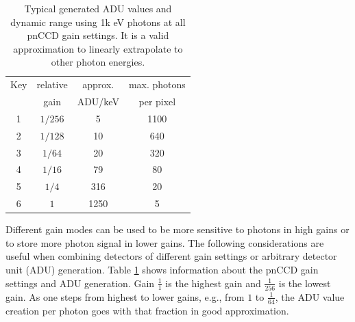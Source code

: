\begin{table}%
\centering
\begin{tabular}{ |c c c c |}
 \hline
 Key & relative  & approx.  & max. photons \\ 
     &   gain    & ADU/keV  & per pixel  \\
 \hline
 1 & $1/256$ & 5 & 1100  \\
 2 & $1/128$ & 10 & 640   \\
 3 & $1/64$ & 20 & 320   \\
 4 & $1/16$ & 79 & 80  \\
 5 & $1/4$ & 316 & 20  \\
 6 & $1$ & 1250 & 5  \\
 \hline
\end{tabular}
\caption[pnCCD gain modes and typical ADU values at 1k eV photons.]{Typical generated ADU values and dynamic range using 1k eV photons at all pnCCD gain settings. It is a valid approximation to linearly extrapolate to other photon energies.}
\label{tab:gain-modes}
\end{table}
Different gain modes can be used to be more sensitive to photons in high gains or to store more photon signal in lower gains.
The following considerations are useful when combining detectors of different gain settings or arbitrary detector unit (ADU) generation. Table \ref{tab:gain-modes} shows information about the pnCCD gain settings and ADU generation. 
Gain $\tfrac{1}{1}$ is the highest gain and $\tfrac{1}{256}$ is the lowest gain. As one steps from highest to lower gains, e.g., from $1$ to $\tfrac{1}{64}$, the ADU value creation per photon goes with that fraction in good approximation.\\[1\baselineskip]
%

